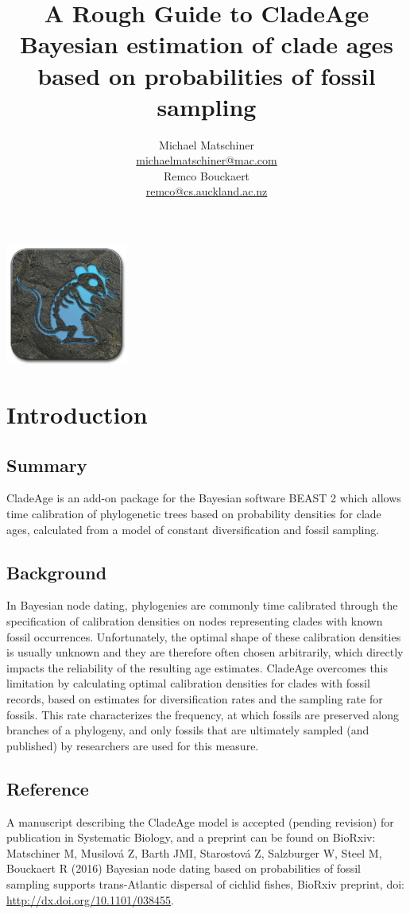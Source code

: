 \documentclass{article}
\title{A Rough Guide to CladeAge\\
{\small Bayesian  estimation of clade ages based on probabilities of fossil sampling}}
\author{Michael Matschiner \\
\href{mailto:michaelmatschiner@mac.com}{michaelmatschiner@mac.com}\vspace{1.5 mm}\\
Remco Bouckaert\\ 
\href{mailto:remco@cs.auckland.ac.nz}{remco@cs.auckland.ac.nz}}
\begin{document}
\maketitle
\begin{center}\includegraphics[width=0.3\textwidth]{cladeage_256x256px.png}\end{center}
\tableofcontents

\section{Introduction}

\subsection{Summary}
CladeAge is an add-on package for the Bayesian software BEAST 2 \citep{Bouckaert:2014ii} which allows time calibration of phylogenetic trees based on probability densities for clade ages, calculated from a model of constant diversification and fossil sampling.

\subsection{Background}
In Bayesian node dating, phylogenies are commonly time calibrated through the specification of calibration densities on nodes representing clades with known fossil occurrences. Unfortunately, the optimal shape of these calibration densities is usually unknown and they are therefore often chosen arbitrarily, which directly impacts the reliability of the resulting age estimates. CladeAge overcomes this limitation by calculating optimal calibration densities for clades with fossil records, based on estimates for diversification rates and the sampling rate for fossils. This rate characterizes the frequency, at which fossils are preserved along branches of a phylogeny, and only fossils that are ultimately sampled (and published) by researchers are used for this measure. 

\subsection{Reference}
A manuscript describing the CladeAge model is accepted (pending revision) for publication in Systematic Biology, and a preprint can be found on BioRxiv:\vspace{1.5 mm} \\
Matschiner M, Musilov\'{a} Z, Barth JMI, Starostov\'{a} Z, Salzburger W, Steel M, Bouckaert R (2016) Bayesian node dating based on probabilities of fossil sampling supports trans-Atlantic dispersal of cichlid fishes, BioRxiv preprint, doi: \href{http://dx.doi.org/10.1101/038455}{http://dx.doi.org/10.1101/038455}.
\end{document}
